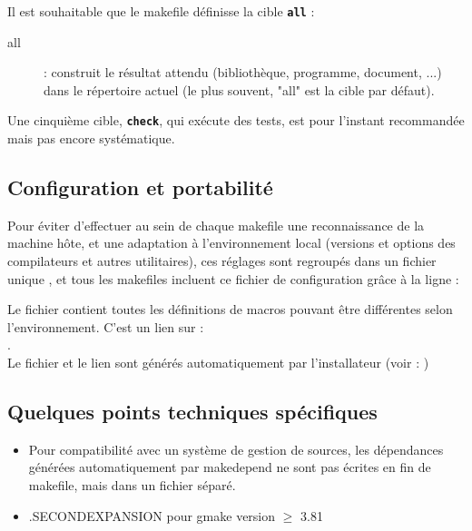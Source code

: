 Il est souhaitable que le makefile définisse la cible \texttt{\textbf{all}} :
\begin{description}
  \item[all] : construit le résultat attendu (bibliothèque, programme,
    document, ...) dans le répertoire actuel (le plus souvent, "all" est la
    cible par défaut).
\end{description}
\bigbreak

Une cinquième cible, \texttt{\textbf{check}}, qui exécute des tests, est pour
l'instant recommandée mais pas encore systématique.


\subsection{Configuration et portabilité}
Pour éviter d'effectuer au sein de chaque makefile une reconnaissance de la
machine hôte, et une adaptation à l'environnement local (versions et options
des compilateurs et autres utilitaires), ces réglages sont regroupés dans un
fichier unique , et tous les makefiles
incluent ce fichier de configuration grâce à la ligne :
\smallbreak
{}
\medbreak

Le fichier  contient toutes les
définitions de macros pouvant être différentes selon l'environnement. C'est un
lien sur :\\
. \\

Le fichier
 et
le lien  sont générés automatiquement par
l'installateur (voir : )

\subsection{Quelques points techniques spécifiques}
\begin{itemize}
\item Pour compatibilité avec
un système de gestion de sources,
les dépendances générées automatiquement par
makedepend ne sont pas écrites en fin de makefile,
mais dans un fichier séparé.
\item .SECONDEXPANSION pour gmake version $\geq$ 3.81
\end{itemize}

